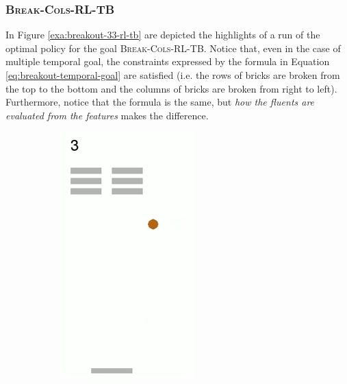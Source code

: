\subsubsection{\textsc{Break-Cols-RL-TB}}
In Figure \ref{exa:breakout-33-rl-tb} are depicted the highlights of a run of the optimal policy for the goal \textsc{Break-Cols-RL-TB}. Notice that, even in the case of multiple temporal goal, the constraints expressed by the formula in Equation \ref{eq:breakout-temporal-goal} are satisfied (i.e. the rows of bricks are broken from the top to the bottom and the columns of bricks are broken from right to left). Furthermore, notice that the formula is the same, but \emph{how the fluents are evaluated from the features}  makes the difference.


\begin{figure}[h]
	\centering
	\begin{subfigure}[b]{0.18\textwidth}
		\includegraphics[width=\textwidth]{images/breakout-33-rl-tb-1.png}

\end{subfigure}
\end{figure}
